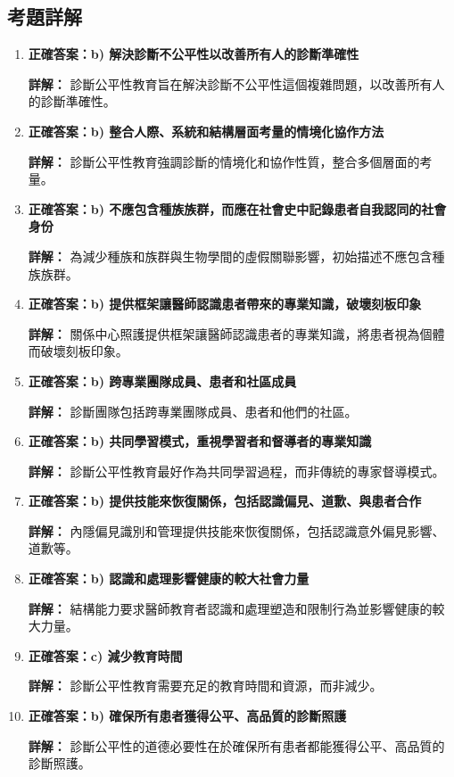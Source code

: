 \documentclass[12pt,a4paper]{article}
\begin{document}
\newpage
\subsection{考題詳解}

\begin{enumerate}
    \item \textbf{正確答案：b) 解決診斷不公平性以改善所有人的診斷準確性}
    
    \textbf{詳解：} 診斷公平性教育旨在解決診斷不公平性這個複雜問題，以改善所有人的診斷準確性。

    \item \textbf{正確答案：b) 整合人際、系統和結構層面考量的情境化協作方法}
    
    \textbf{詳解：} 診斷公平性教育強調診斷的情境化和協作性質，整合多個層面的考量。

    \item \textbf{正確答案：b) 不應包含種族族群，而應在社會史中記錄患者自我認同的社會身份}
    
    \textbf{詳解：} 為減少種族和族群與生物學間的虛假關聯影響，初始描述不應包含種族族群。

    \item \textbf{正確答案：b) 提供框架讓醫師認識患者帶來的專業知識，破壞刻板印象}
    
    \textbf{詳解：} 關係中心照護提供框架讓醫師認識患者的專業知識，將患者視為個體而破壞刻板印象。

    \item \textbf{正確答案：b) 跨專業團隊成員、患者和社區成員}
    
    \textbf{詳解：} 診斷團隊包括跨專業團隊成員、患者和他們的社區。

    \item \textbf{正確答案：b) 共同學習模式，重視學習者和督導者的專業知識}
    
    \textbf{詳解：} 診斷公平性教育最好作為共同學習過程，而非傳統的專家督導模式。

    \item \textbf{正確答案：b) 提供技能來恢復關係，包括認識偏見、道歉、與患者合作}
    
    \textbf{詳解：} 內隱偏見識別和管理提供技能來恢復關係，包括認識意外偏見影響、道歉等。

    \item \textbf{正確答案：b) 認識和處理影響健康的較大社會力量}
    
    \textbf{詳解：} 結構能力要求醫師教育者認識和處理塑造和限制行為並影響健康的較大力量。

    \item \textbf{正確答案：c) 減少教育時間}
    
    \textbf{詳解：} 診斷公平性教育需要充足的教育時間和資源，而非減少。

    \item \textbf{正確答案：b) 確保所有患者獲得公平、高品質的診斷照護}
    
    \textbf{詳解：} 診斷公平性的道德必要性在於確保所有患者都能獲得公平、高品質的診斷照護。
\end{enumerate}
\end{document}
